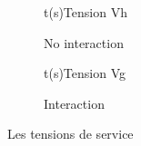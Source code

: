   \begin{figure}[h]  
  \centering 
    \begin{subfigure}[b]{0.4\linewidth}
      \begin{graphic}{0.8}{1}{0}{1.2}{-1}{5}{t(s)}{Tension V}{h}
        \end{graphic}%
      \caption{No interaction} 
    \end{subfigure}
  \begin{subfigure}[b]{0.4\linewidth}
    \begin{graphic}{0.8}{1}{0}{4}{-0.3}{0.3}{t(s)}{Tension V}{g}
      \end{graphic}%
  \caption{Interaction}
  \end{subfigure}
  \caption{Les tensions de service}
  \end{figure}  








